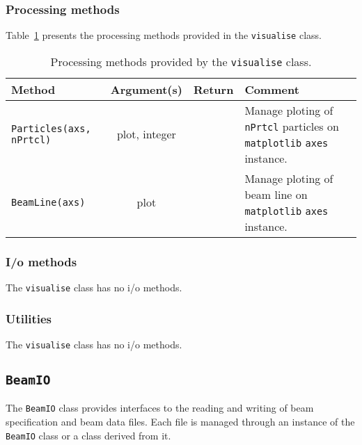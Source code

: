 \subsubsection{Processing methods}
\noindent
Table~\ref{Tab:vis:ProcMethods} presents the processing methods provided
in the \texttt{visualise} class.
\begin{table}[h]
  \caption{
    Processing methods provided by the \texttt{visualise}
    class. 
  }
  \label{Tab:vis:ProcMethods}
  \begin{center}
    \begin{tabular}{|l|c|c|p{7cm}|}
      \hline
      \textbf{Method} & \textbf{Argument(s)} & \textbf{Return} & \textbf{Comment}                                                       \\
      \hline
      \texttt{Particles(axs, nPrtcl)} & plot, integer  & & Manage ploting of \texttt{nPrtcl} particles on \texttt{matplotlib} \texttt{axes}
                                                           instance.                                                                    \\
      \texttt{BeamLine(axs)}          & plot           & & Manage ploting of beam line on \texttt{matplotlib} \texttt{axes} instance.   \\
      \hline
    \end{tabular}
  \end{center}
\end{table}

\subsubsection{I/o methods}
\noindent
The \texttt{visualise} class has no i/o methods.

\subsubsection{Utilities}
\noindent
The \texttt{visualise} class has no i/o methods.

\FloatBarrier

\subsection{\texttt{BeamIO}}
\label{SubSect:BmIO}

The \texttt{BeamIO} class provides interfaces to the reading and
writing of beam specification and beam data files.
Each file is managed through an instance of the \texttt{BeamIO} class
or a class derived from it.

